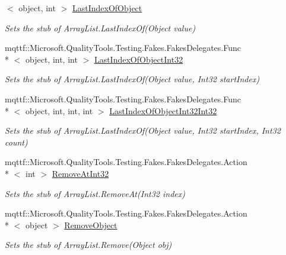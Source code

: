\begin{DoxyCompactItemize}
$<$ object, int $>$ \hyperlink{class_system_1_1_collections_1_1_fakes_1_1_stub_array_list_a8a42a5630733bc4449938e72a6ac1079}{Last\-Index\-Of\-Object}
\begin{DoxyCompactList}\small\item\em Sets the stub of Array\-List.\-Last\-Index\-Of(\-Object value)\end{DoxyCompactList}\item 
mqttf\-::\-Microsoft.\-Quality\-Tools.\-Testing.\-Fakes.\-Fakes\-Delegates.\-Func\\*
$<$ object, int, int $>$ \hyperlink{class_system_1_1_collections_1_1_fakes_1_1_stub_array_list_ae5faf8f0a373d1bfb7307460ba7c2cad}{Last\-Index\-Of\-Object\-Int32}
\begin{DoxyCompactList}\small\item\em Sets the stub of Array\-List.\-Last\-Index\-Of(\-Object value, Int32 start\-Index)\end{DoxyCompactList}\item 
mqttf\-::\-Microsoft.\-Quality\-Tools.\-Testing.\-Fakes.\-Fakes\-Delegates.\-Func\\*
$<$ object, int, int, int $>$ \hyperlink{class_system_1_1_collections_1_1_fakes_1_1_stub_array_list_a55ca958960d5aa1c94cef74dbbd29454}{Last\-Index\-Of\-Object\-Int32\-Int32}
\begin{DoxyCompactList}\small\item\em Sets the stub of Array\-List.\-Last\-Index\-Of(\-Object value, Int32 start\-Index, Int32 count)\end{DoxyCompactList}\item 
mqttf\-::\-Microsoft.\-Quality\-Tools.\-Testing.\-Fakes.\-Fakes\-Delegates.\-Action\\*
$<$ int $>$ \hyperlink{class_system_1_1_collections_1_1_fakes_1_1_stub_array_list_ada5934882309fb9a1f0ddd2b05fc6faf}{Remove\-At\-Int32}
\begin{DoxyCompactList}\small\item\em Sets the stub of Array\-List.\-Remove\-At(\-Int32 index)\end{DoxyCompactList}\item 
mqttf\-::\-Microsoft.\-Quality\-Tools.\-Testing.\-Fakes.\-Fakes\-Delegates.\-Action\\*
$<$ object $>$ \hyperlink{class_system_1_1_collections_1_1_fakes_1_1_stub_array_list_aee843eedb548c9232c8b78f2277af918}{Remove\-Object}
\begin{DoxyCompactList}\small\item\em Sets the stub of Array\-List.\-Remove(\-Object obj)\end{DoxyCompactList}\item 

\end{DoxyCompactItemize}
